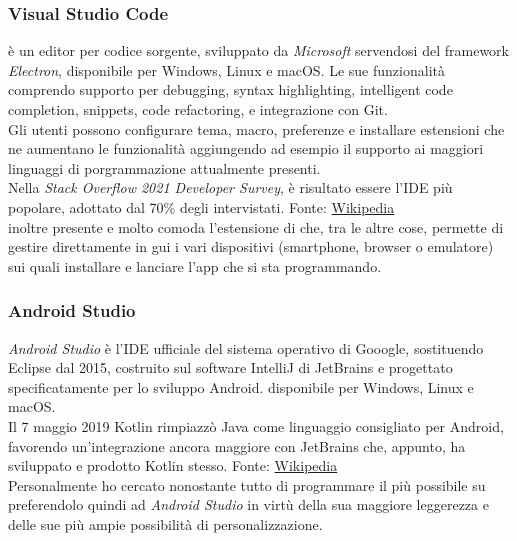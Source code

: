 \subsubsection{Visual Studio Code}
\vsc{} è un editor per codice sorgente, sviluppato da \textit{Microsoft} servendosi del framework \textit{Electron}, disponibile per Windows, Linux e macOS. Le sue funzionalità comprendo supporto per debugging, syntax highlighting, intelligent code completion, snippets, code refactoring, e integrazione con Git. \\
Gli utenti possono configurare tema, macro, preferenze e installare estensioni che ne aumentano le funzionalità aggiungendo ad esempio il supporto ai maggiori linguaggi di porgrammazione attualmente presenti.\\
Nella \textit{Stack Overflow 2021 Developer Survey}, \vsc{} è risultato essere l'IDE più popolare, adottato dal 70\% degli intervistati. {\tiny Fonte: \href{https://en.wikipedia.org/wiki/Visual_Studio_Code}{Wikipedia}}\\
\E{} inoltre presente e molto comoda l'estensione di \flutter{} che, tra le altre cose, permette di gestire direttamente in gui i vari dispositivi (smartphone, browser o emulatore) sui quali installare e lanciare l'app che si sta programmando.

\subsubsection{Android Studio}
\textit{Android Studio} è l'IDE ufficiale del sistema operativo di Gooogle, sostituendo Eclipse dal 2015, costruito sul software IntelliJ di JetBrains e progettato specificatamente per lo sviluppo Android. \E{} disponibile per Windows, Linux e macOS.\\
Il 7 maggio 2019 Kotlin rimpiazzò Java come linguaggio consigliato per Android, favorendo un'integrazione ancora maggiore con JetBrains che, appunto, ha sviluppato e prodotto Kotlin stesso. {\tiny Fonte: \href{https://en.wikipedia.org/wiki/Android_Studio}{Wikipedia}}\\
Personalmente ho cercato nonostante tutto di programmare il più possibile su \vsc{} preferendolo quindi ad \textit{Android Studio} in virtù della sua maggiore leggerezza e delle sue più ampie possibilità di personalizzazione.

